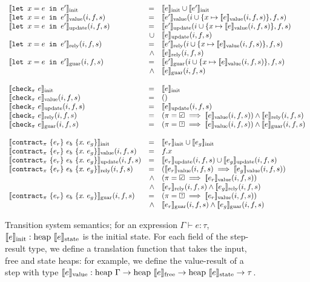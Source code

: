 \begin{figure}
\[\begin{array}{lrl}
    \\
    \sysinit{\xlet{x}{e}{e'}} & = & \sysinit{e} \cup \sysinit{e'} \\
    \sysvalue{\xlet{x}{e}{e'}}(i, f, s) & = & \sysvalue{e'}(i \cup \{ x \mapsto \sysvalue{e}(i, f, s)\}, f, s) \\
    \sysupdate{\xlet{x}{e}{e'}}(i, f, s) & = & \sysupdate{e'}(i \cup \{ x \mapsto \sysvalue{e}(i, f, s)\}, f, s) \\
      & \cup & \sysupdate{e}(i, f, s) \\
    \sysrely{\xlet{x}{e}{e'}}(i, f, s) & = & \sysrely{e'}(i \cup \{ x \mapsto \sysvalue{e}(i, f, s)\}, f, s) \\
      & \wedge & \sysrely{e}(i, f, s) \\
    \sysguar{\xlet{x}{e}{e'}}(i, f, s) & = & \sysguar{e'}(i \cup \{ x \mapsto \sysvalue{e}(i, f, s)\}, f, s) \\
      & \wedge & \sysguar{e}(i, f, s) \\
    \\
    \sysinit{\xcheckP{\PStatus}{e}} & = & \sysinit{e} \\
    \sysvalue{\xcheckP{\PStatus}{e}}(i, f, s) & = & () \\
    \sysupdate{\xcheckP{\PStatus}{e}}(i, f, s) & = & \sysupdate{e}(i, f, s) \\
    \sysrely{\xcheckP{\PStatus}{e}}(i, f, s) & = & (\PStatus = \PSValid \implies \sysvalue{e}(i, f, s)) \wedge \sysrely{e}(i, f, s) \\
    \sysguar{\xcheckP{\PStatus}{e}}(i, f, s) & = & (\PStatus = \PSUnknown \implies \sysvalue{e}(i, f, s)) \wedge \sysguar{e}(i, f, s) \\
    \\
    \sysinit{\xctr} & = & \sysinit{e_r} \cup \sysinit{e_g} \\
    \sysvalue{\xctr}(i, f, s) & = & f.x \\
    \sysupdate{\xctr}(i, f, s) & = & \sysupdate{e_r}(i, f, s) \cup \sysupdate{e_g}(i, f, s) \\
    \sysrely{\xctr}(i, f, s) & = & (\sysvalue{e_r}(i, f, s) \implies \sysvalue{e_g}(i, f, s)) \\
                            & \wedge & (\PStatus = \PSValid \implies \sysvalue{e_r}(i, f, s)) \\
                            & \wedge & \sysrely{e_r}(i, f, s) \wedge \sysrely{e_g}(i, f, s) \\
    \sysguar{\xctr}(i, f, s) & = & (\PStatus = \PSUnknown \implies \sysvalue{e_r}(i, f, s)) \\
    & \wedge & \sysguar{e_r}(i, f, s) \wedge \sysguar{e_g}(i, f, s) \\
\end{array}
  \]
  \caption{Transition system semantics; for an expression $\Gamma \vdash e: \tau$, $\llbracket e \rrbracket_{\text{init}} : \text{heap~}\llbracket e \rrbracket_{\text{state}}$ is the initial state. For each field of the step-result type, we define a translation function that takes the input, free and state heaps: for example, we define the value-result of a step with type $\llbracket e \rrbracket_{\text{value}}: \text{heap~}\Gamma \to \text{heap~}\llbracket e \rrbracket_{\text{free}} \to \text{heap~}\llbracket e \rrbracket_{\text{state}} \to \tau$.}
  \label{f:system-translation}
\end{figure}